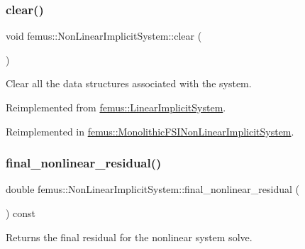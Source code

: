 \subsubsection{\texorpdfstring{clear()}{clear()}}
{\footnotesize\ttfamily void femus\+::\+Non\+Linear\+Implicit\+System\+::clear (\begin{DoxyParamCaption}{ }\end{DoxyParamCaption})\hspace{0.3cm}{\ttfamily [virtual]}}

Clear all the data structures associated with the system. 

Reimplemented from \mbox{\hyperlink{classfemus_1_1_linear_implicit_system_ace039665432e53db0c25b0efede44a76}{femus\+::\+Linear\+Implicit\+System}}.



Reimplemented in \mbox{\hyperlink{classfemus_1_1_monolithic_f_s_i_non_linear_implicit_system_ac7f2bedf4d1c6b00f5443cb5128a3069}{femus\+::\+Monolithic\+F\+S\+I\+Non\+Linear\+Implicit\+System}}.

\mbox{\label{classfemus_1_1_non_linear_implicit_system_aaaf3f8e71dcc85553312c1a326d69225}} 
\subsubsection{\texorpdfstring{final\+\_\+nonlinear\+\_\+residual()}{final\_nonlinear\_residual()}}
{\footnotesize\ttfamily double femus\+::\+Non\+Linear\+Implicit\+System\+::final\+\_\+nonlinear\+\_\+residual (\begin{DoxyParamCaption}{ }\end{DoxyParamCaption}) const\hspace{0.3cm}{\ttfamily [inline]}}

Returns the final residual for the nonlinear system solve. \mbox{\label{classfemus_1_1_non_linear_implicit_system_ad2d20975e0c919a9d99bdd9368a0212a}} 
